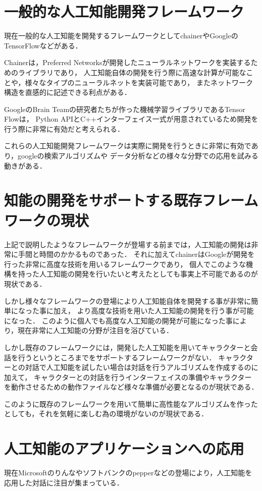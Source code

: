 \section{一般的な人工知能開発フレームワーク}
現在一般的な人工知能を開発するフレームワークとしてchainerやGoogleのTensorFlowなどがある．

Chainerは，Preferred Networksが開発したニューラルネットワークを実装するためのライブラリであり，
人工知能自体の開発を行う際に高速な計算が可能なことや，様々なタイプのニューラルネットを実装可能であり，
またネットワーク構造を直感的に記述できる利点がある．

GoogleのBrain Teamの研究者たちが作った機械学習ライブラリであるTensor Flowは，
Python APIとC++インターフェイス一式が用意されているため開発を行う際に非常に有効だと考えられる．

これらの人工知能開発フレームワークは実際に開発を行うときに非常に有効であり，googleの検索アルゴリズムや
データ分析などの様々な分野での応用を試みる動きがある．

\section{知能の開発をサポートする既存フレームワークの現状}
上記で説明したようなフレームワークが登場する前までは，人工知能の開発は非常に手間と時間のかかるものであった．
それに加えてchainerはGoogleが開発を行った非常に高度な技術を用いるフレームワークであり，
個人でこのような機構を持った人工知能の開発を行いたいと考えたとしても事実上不可能であるのが現状である．

しかし様々なフレームワークの登場により人工知能自体を開発する事が非常に簡単になった事に加え，
より高度な技術を用いた人工知能の開発を行う事が可能になった．
このように個人でも高度な人工知能の開発が可能になった事により，現在非常に人工知能の分野が注目を浴びている．

しかし既存のフレームワークには，開発した人工知能を用いてキャラクターと会話を行うというところまでをサポートするフレームワークがない．
キャラクターとの対話で人工知能を試したい場合は対話を行うアルゴリズムを作成するのに加えて，
キャラクターとの対話を行うインターフェイスの準備やキャラクターを動作させるための動作ファイルなど様々な準備が必要となるのが現状である．

このように既存のフレームワークを用いて簡単に高性能なアルゴリズムを作ったとしても，それを気軽に楽しむ為の環境がないのが現状である．

\newpage

\section{人工知能のアプリケーションへの応用}
現在Microsoftのりんな\cite{rinna}やソフトバンクのpepper\cite{pepper}などの登場により，人工知能を応用した対話に注目が集まっている．

